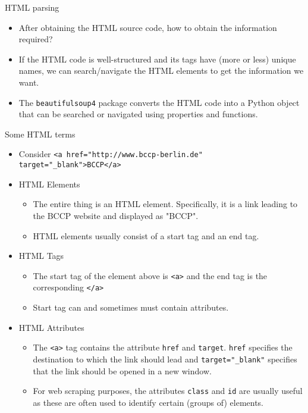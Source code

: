 \begin{frame}{HTML parsing}
\begin{itemize}
	\item After obtaining the HTML source code, how to obtain the information required?
	\item If the HTML code is well-structured and its tags have (more or less) unique names, we can search/navigate the HTML elements to get the information we want.
	\item The \texttt{beautifulsoup4} package converts the HTML code into a Python object that can be searched or navigated using properties and functions.
\end{itemize}
\end{frame}

\begin{frame}[fragile]{Some HTML terms}
\begin{itemize}
	\item Consider \texttt{<a href="http://www.bccp-berlin.de" target="_blank">BCCP</a>}	 
	\item HTML Elements
	\begin{itemize}
		\item The entire thing is an HTML element. Specifically, it is a link leading to the BCCP website and displayed as "BCCP".
		\item HTML elements usually consist of a start tag and an end tag.
	\end{itemize}
	\item HTML Tags
	\begin{itemize}
		\item The start tag of the element above is  \texttt{<a>} and the end tag is the corresponding  \texttt{</a>}
		\item Start tag can and sometimes must contain attributes.
	\end{itemize}
	\item HTML Attributes
	\begin{itemize}
		\item The  \texttt{<a>} tag contains the attribute  \texttt{href} and  \texttt{target}.  \texttt{href} specifies the destination to which the link should lead and  \texttt{target="\_blank"} specifies that the link should be opened in a new window.
		\item For web scraping purposes, the attributes  \texttt{class} and  \texttt{id} are usually useful as these are often used to identify certain (groups of) elements.
	\end{itemize}
\end{itemize}
\end{frame}

